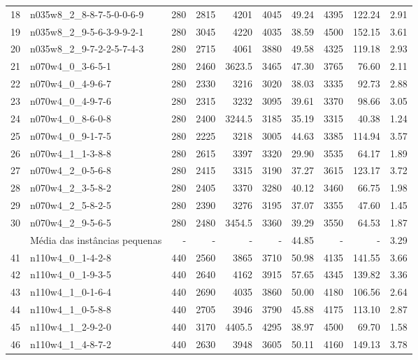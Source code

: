 \documentclass[cic,tc, twoside]{iiufrgs}
\begin{document}
\begin{table}[!]
{\begin{tabular}{rlrrrrrrrr}
18	&	n035w8\_2\_8-8-7-5-0-0-6-9	&	280	&	2815	&	4201	&	4045	&	49.24	&	4395	&	122.24	&	2.91	\\
19	&	n035w8\_2\_9-5-6-3-9-9-2-1	&	280	&	3045	&	4220	&	4035	&	38.59	&	4500	&	152.15	&	3.61	\\
20	&	n035w8\_2\_9-7-2-2-5-7-4-3	&	280	&	2715	&	4061	&	3880	&	49.58	&	4325	&	119.18	&	2.93	\\
21	&	n070w4\_0\_3-6-5-1			&	280	&	2460	&	3623.5	&	3465	&	47.30	&	3765	&	76.60	&	2.11	\\
22	&	n070w4\_0\_4-9-6-7			&	280	&	2330	&	3216	&	3020	&	38.03	&	3335	&	92.73	&	2.88	\\
23	&	n070w4\_0\_4-9-7-6			&	280	&	2315	&	3232	&	3095	&	39.61	&	3370	&	98.66	&	3.05	\\
24	&	n070w4\_0\_8-6-0-8			&	280	&	2400	&	3244.5	&	3185	&	35.19	&	3315	&	40.38	&	1.24	\\
25	&	n070w4\_0\_9-1-7-5			&	280	&	2225	&	3218	&	3005	&	44.63	&	3385	&	114.94	&	3.57	\\
26	&	n070w4\_1\_1-3-8-8			&	280	&	2615	&	3397	&	3320	&	29.90	&	3535	&	64.17	&	1.89	\\
27	&	n070w4\_2\_0-5-6-8			&	280	&	2415	&	3315	&	3190	&	37.27	&	3615	&	123.17	&	3.72	\\
28	&	n070w4\_2\_3-5-8-2			&	280	&	2405	&	3370	&	3280	&	40.12	&	3460	&	66.75	&	1.98	\\
29	&	n070w4\_2\_5-8-2-5			&	280	&	2390	&	3276	&	3195	&	37.07	&	3355	&	47.60	&	1.45	\\
30	&	n070w4\_2\_9-5-6-5			&	280	&	2480	&	3454.5	&	3360	&	39.29	&	3550	&	64.53	&	1.87	\\
  \midrule		
    &   Média das instâncias pequenas&    -  &   -       &   -       &   -       &	44.85   &   -       &   -       &   3.29  \\		
  \midrule					
41	&	n110w4\_0\_1-4-2-8			&	440	&	2560	&	3865	&	3710	&	50.98	&	4135	&	141.55	&	3.66	\\
42	&	n110w4\_0\_1-9-3-5			&	440	&	2640	&	4162	&	3915	&	57.65	&	4345	&	139.82	&	3.36	\\
43	&	n110w4\_1\_0-1-6-4			&	440	&	2690	&	4035	&	3860	&	50.00	&	4180	&	106.56	&	2.64	\\
44	&	n110w4\_1\_0-5-8-8			&	440	&	2705	&	3946	&	3790	&	45.88	&	4175	&	113.10	&	2.87	\\
45	&	n110w4\_1\_2-9-2-0			&	440	&	3170	&	4405.5	&	4295	&	38.97	&	4500	&	69.70	&	1.58	\\
46	&	n110w4\_1\_4-8-7-2			&	440	&	2630	&	3948	&	3605	&	50.11	&	4160	&	149.13	&	3.78	\\

\end{tabular}}
\end{table}
\end{document}
